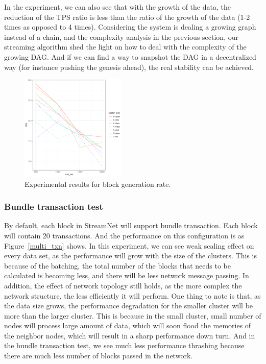 In the experiment, we can also see that with the growth of the data, the reduction of the TPS ratio is less than the ratio of the growth of the data (1-2 times as opposed to 4 times).
Considering the system is dealing a growing graph instead of a chain, and the complexity analysis in the previous section,
our streaming algorithm shed the light on how to deal with the complexity of the growing DAG.
And if we can find a way to snapshot the DAG in a decentralized way (for instance pushing the genesis ahead), the real stability can be achieved.

\begin{figure}[!ht]
\begin{center}
\includegraphics[width=0.45\textwidth]{figures/single_txn.pdf}
    \caption{
        Experimental results for block generation rate.
     }
\label{single_txn}
\end{center}
\end{figure}



\subsubsection {Bundle transaction test}

By default, each block in StreamNet will support bundle transaction. 
Each block will contain 20 transactions.
And the performance on this configuration is as Figure~\ref{multi_txn} shows.
In this experiment, we can see weak scaling effect on every data set, as the performance will grow with the size of the clusters.
This is because of the batching, the total number of the blocks that needs to be calculated is becoming less, and there will be less network message passing.
In addition, the effect of network topology still holds, as the more complex the network structure, the less efficiently it will perform.
One thing to note is that, as the data size grows, the performance degradation for the smaller cluster will be more than the larger cluster.
This is because in the small cluster, small number of nodes will process large amount of data, which will soon flood the memories of the neighbor nodes, which will result in a sharp performance down turn.
And in the bundle transaction test, we see much less performance thrashing because there are much less number of blocks passed in the network. 

